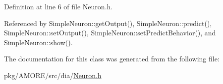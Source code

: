 Definition at line 6 of file Neuron.h.



Referenced by SimpleNeuron::getOutput(), SimpleNeuron::predict(), SimpleNeuron::setOutput(), SimpleNeuron::setPredictBehavior(), and SimpleNeuron::show().



The documentation for this class was generated from the following file:\begin{DoxyCompactItemize}
\item 
pkg/AMORE/src/dia/\hyperlink{_neuron_8h}{Neuron.h}\end{DoxyCompactItemize}
